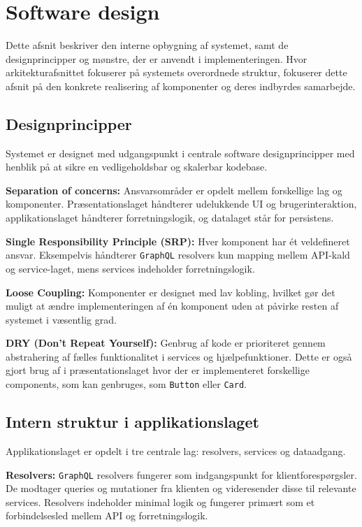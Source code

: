 \section{Software design}

Dette afsnit beskriver den interne opbygning af systemet, samt de designprincipper og mønstre,
der er anvendt i implementeringen.
Hvor arkitekturafsnittet fokuserer på systemets overordnede struktur, fokuserer dette afsnit på den
konkrete realisering af komponenter og deres indbyrdes samarbejde.

\subsection{Designprincipper}

Systemet er designet med udgangspunkt i centrale software designprincipper med henblik på at sikre en
vedligeholdsbar og skalerbar kodebase.

\textbf{Separation of concerns:}
Ansvarsområder er opdelt mellem forskellige lag og komponenter.
Præsentationslaget håndterer udelukkende UI og brugerinteraktion, applikationslaget håndterer
forretningslogik, og datalaget står for persistens.

\textbf{Single Responsibility Principle (SRP):}
Hver komponent har ét veldefineret ansvar.
Eksempelvis håndterer \texttt{GraphQL} resolvers kun mapping mellem API-kald og service-laget,
mens services indeholder forretningslogik.

\textbf{Loose Coupling:}
Komponenter er designet med lav kobling, hvilket gør det muligt at ændre implementeringen af én
komponent uden at påvirke resten af systemet i væsentlig grad.

\textbf{DRY (Don't Repeat Yourself):}
Genbrug af kode er prioriteret gennem abstrahering af fælles funktionalitet i services og hjælpefunktioner.
Dette er også gjort brug af i præsentationslaget hvor der er implementeret forskellige components,
som kan genbruges, som \texttt{Button} eller \texttt{Card}.

\subsection{Intern struktur i applikationslaget}

Applikationslaget er opdelt i tre centrale lag: resolvers, services og dataadgang.

\textbf{Resolvers:}
\texttt{GraphQL} resolvers fungerer som indgangspunkt for klientforespørgsler.
De modtager queries og mutationer fra klienten og videresender disse til relevante services.
Resolvers indeholder minimal logik og fungerer primært som et forbindelsesled mellem API og
forretningslogik.

